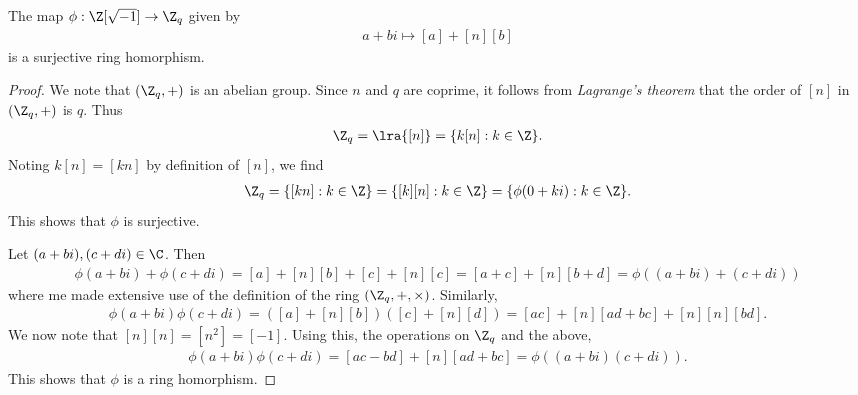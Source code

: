 \documentclass{article}
\begin{document}
\begin{claim*}[3]
   The map $\phi:\gaussint\to\Z_{q}$ given by 
   \begin{align*}
      a + bi \mapsto [a]+[n][b]
   \end{align*}
   is a surjective ring homorphism.
   \begin{proof}
      We note that $(\Z_q,+)$ is an abelian group. Since $n$ and $q$ are coprime, it follows from 
      \emph{Lagrange's theorem} that the order of $[n]$ in $(\Z_q,+)$ is $q$. Thus 
      \begin{align*}
         \Z_q = \lra{[n]} = \{k[n] : k\in\Z\}.
      \end{align*}
      Noting $k[n]=[kn]$ by definition of $[n]$, we find 
      \begin{align*}
         \Z_q = \{[kn] : k\in\Z\} = \{[k][n] : k\in\Z\} = \{\phi(0+ki):k\in\Z\}.
      \end{align*}
      This shows that $\phi$ is surjective.

      Let $(a+bi),(c+di)\in\C$. Then
      \begin{align*}
         \phi(a+bi) + \phi(c+di) = [a] + [n][b] + [c] + [n][c] = [a+c] + [n][b+d] = \phi((a+bi) + (c+di))
      \end{align*}
      where me made extensive use of the definition of the ring $(\Z_q,+,\times)$.
      Similarly,
      \begin{align*}
         \phi(a+bi)\phi(c+di)=([a]+[n][b])([c]+[n][d])=[ac]+[n][ad+bc]+[n][n][bd].
      \end{align*}
      We now note that $[n][n]=[n^2]=[-1]$. Using this, the operations on $\Z_q$ and the above,
      \begin{align*}
         \phi(a+bi)\phi(c+di)=[ac-bd]+[n][ad+bc]=\phi((a+bi)(c+di)).
      \end{align*}
      This shows that $\phi$ is a ring homorphism.
   \end{proof}
\end{claim*}
\end{document}
